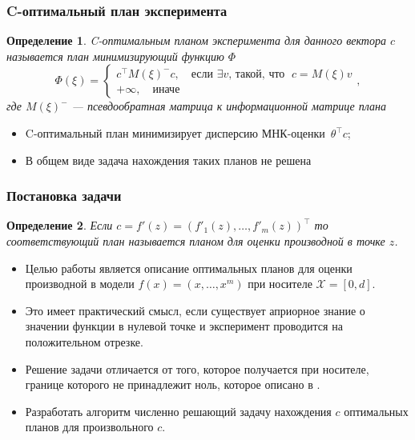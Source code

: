 \documentclass[unicode, notheorems, minimal, nologo]{beamer}
\newtheorem{definition}{Определение}
\begin{document}
\begin{frame}
	\frametitle{C-оптимальный план эксперимента}
	\begin{definition}
		C-оптимальным планом эксперимента для данного вектора $c$ называется план минимизирующий функцию $\Phi$
		\begin{equation*}
				\Phi(\xi) = \begin{cases}
				c^\top M(\xi)^{-} c, \quad \text{если } \exists v \text{, такой, что } \; c = M(\xi) v\\
				+\infty, \quad  \text{иначе}
		    \end{cases},
		\end{equation*}
		где $M(\xi)^{-}$ --- псевдообратная матрица к информационной матрице плана
	\end{definition}
	
	\begin{itemize}
		\item C-оптимальный план минимизирует дисперсию МНК-оценки~$\theta^\top c$;
		\item В общем виде задача нахождения таких планов не решена
	\end{itemize}
	
  
\end{frame}

\begin{frame}
	\frametitle{Постановка задачи}
	\begin{definition}
	Если $c = f'(z) = \left(f'_1(z), \ldots, f'_m(z) \right)^\top$ то соответствующий план называется планом для оценки производной в точке $z$.
	\end{definition}
	\begin{itemize}
		\item Целью работы является описание оптимальных планов для оценки производной в модели $f(x) = \left(x, \ldots, x^m \right)$ при носителе $\mathcal{X} = [0, d]$.
		\item Это имеет практический смысл, если существует априорное знание о значении функции в нулевой точке и эксперимент проводится на положительном отрезке.
		\item Решение задачи отличается от того, которое получается при носителе, границе которого не принадлежит ноль, которое описано в \citep{melasmain}.
		\item Разработать алгоритм численно решающий задачу нахождения $c$ оптимальных планов для произвольного $c$.
	\end{itemize}
	
\end{frame}
\end{document}
